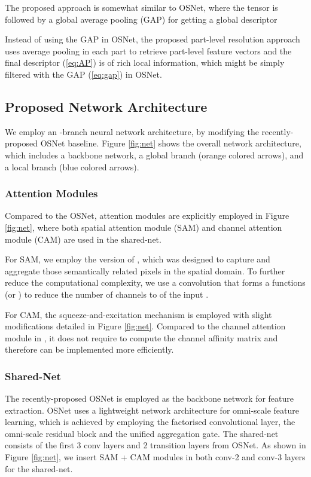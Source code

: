 \documentclass[journal]{IEEEtran}
\begin{document}
The proposed approach is somewhat similar to OSNet, where the tensor  is followed by a  global average pooling (GAP) for getting a global descriptor

Instead of using the GAP in OSNet, the proposed part-level resolution approach uses average pooling in each part to retrieve part-level feature vectors and the final descriptor  (\ref{eq:AP}) is of rich local information, which might be simply filtered with the GAP (\ref{eq:gap}) in OSNet.

\subsection{Proposed Network Architecture}
We employ an -branch neural network architecture, by modifying the recently-proposed OSNet baseline. Figure \ref{fig:net} shows the overall network architecture, which includes a backbone network, a global branch (orange colored arrows), and a local branch (blue colored arrows).

\subsubsection{Attention Modules}
Compared to the OSNet, attention modules are explicitly employed in Figure \ref{fig:net}, where both spatial attention module (SAM) and channel attention module (CAM) are used in the shared-net.

For SAM, we employ the version of \cite{chen2019ABD}, which was designed to capture and aggregate those semantically related pixels in the spatial domain. To further reduce the computational complexity, we use a  convolution that forms a functions  (or ) to reduce the number of channels  to  of the input .

For CAM, the squeeze-and-excitation mechanism \cite{hu2018SE} is employed with slight modifications detailed in Figure \ref{fig:net}. Compared to the channel attention module in \cite{chen2019ABD}, it does not require to compute the channel affinity matrix and therefore can be implemented more efficiently.

\subsubsection{Shared-Net}
The recently-proposed OSNet is employed as the backbone network for feature extraction. OSNet uses a lightweight network architecture for omni-scale feature learning, which is achieved by employing the factorised convolutional layer, the omni-scale residual block and the unified aggregation gate. The shared-net consists of  the first 3 conv layers and 2 transition layers from OSNet. As shown in Figure \ref{fig:net}, we insert SAM + CAM  modules in both conv-2 and conv-3 layers for the shared-net.
\end{document}

